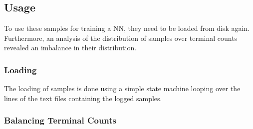 \subsection{Usage}

To use these samples for training a \gls{NN}, they need to be loaded from disk again. Furthermore, an analysis of the distribution of samples over terminal counts revealed an imbalance in their distribution.

\subsubsection{Loading}

The loading of samples is done using a simple state machine looping over the lines of the text files containing the logged samples.

\subsubsection{Balancing Terminal Counts}

